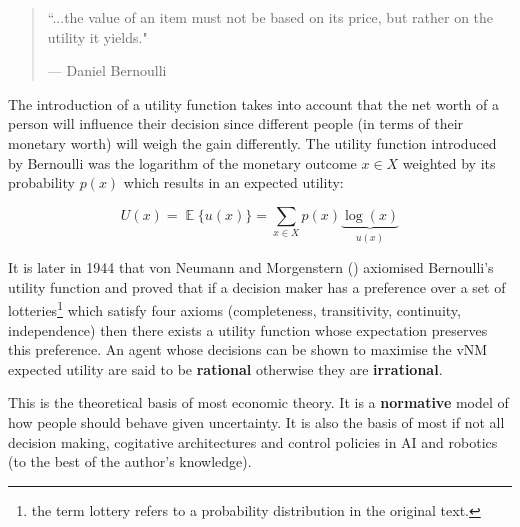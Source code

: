 \begin{quote}
  \onehalfspacing%
  ``...the value of an item must not be based on its price, but rather on the utility it yields."\par\raggedleft--- \textup{Daniel Bernoulli}
\end{quote}

The introduction of a utility function takes into account that the net worth of a person will influence their decision since 
different people (in terms of their monetary worth) will weigh the gain differently. The utility function introduced by Bernoulli 
was the logarithm of the monetary outcome $x \in X$ weighted by its probability $p(x)$ which results in an expected utility: 

\begin{equation*}\label{eq:exp_utility}
  U(x) = \displaystyle \mathop{\mathbb{E}} \{ u(x) \} = \sum_{x\in X} p(x) \underbrace{\log(x)}_{u(x)}
\end{equation*}


It is later in 1944 that von Neumann and Morgenstern (\cite{VonNeumann1944}) axiomised Bernoulli's utility function 
and proved that if a decision maker has a preference over a set of lotteries\footnote{the term lottery refers 
to a probability distribution in the original text.} which satisfy four axioms
(completeness, transitivity, continuity, independence) then there exists a utility function whose expectation 
preserves this preference. An agent whose decisions can be shown to maximise the vNM expected utility are said 
to be \textbf{rational} otherwise they are \textbf{irrational}.



This is the theoretical basis of most economic theory. It is a \textbf{normative} model of how people should behave given uncertainty. It is also the basis of most 
if not all decision making, cogitative architectures and control policies in AI and robotics (to the best of the author's knowledge).

